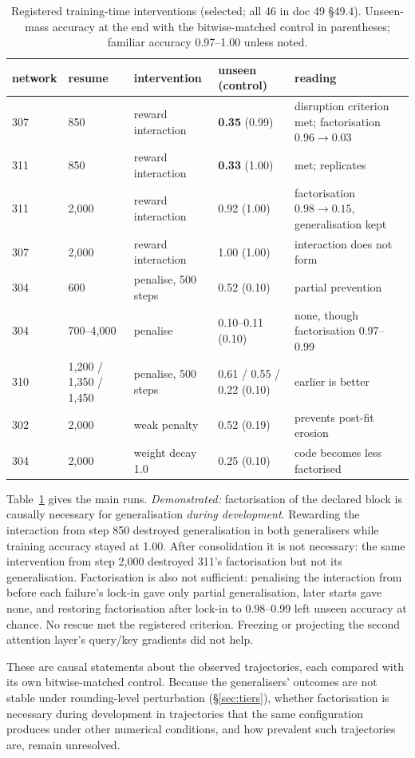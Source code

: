 \documentclass[11pt]{article}
\begin{document}
\begin{table}[t]\centering\small
\caption{Registered training-time interventions (selected; all 46 in doc 49 \S49.4). Unseen-mass accuracy at the end
with the bitwise-matched control in parentheses; familiar accuracy 0.97--1.00 unless noted.}\label{tab:causal}
\begin{tabular}{@{}llllp{3.8cm}@{}}\toprule
network & resume & intervention & unseen (control) & reading\\\midrule
307 & 850 & reward interaction & \textbf{0.35} (0.99) & disruption criterion met; factorisation $0.96\to0.03$\\
311 & 850 & reward interaction & \textbf{0.33} (1.00) & met; replicates\\
311 & 2,000 & reward interaction & 0.92 (1.00) & factorisation $0.98\to0.15$, generalisation kept\\
307 & 2,000 & reward interaction & 1.00 (1.00) & interaction does not form\\
304 & 600 & penalise, 500 steps & 0.52 (0.10) & partial prevention\\
304 & 700--4,000 & penalise & 0.10--0.11 (0.10) & none, though factorisation 0.97--0.99\\
310 & 1,200 / 1,350 / 1,450 & penalise, 500 steps & 0.61 / 0.55 / 0.22 (0.10) & earlier is better\\
302 & 2,000 & weak penalty & 0.52 (0.19) & prevents post-fit erosion\\
304 & 2,000 & weight decay 1.0 & 0.25 (0.10) & code becomes less factorised\\\bottomrule
\end{tabular}
\end{table}
Table~\ref{tab:causal} gives the main runs. \emph{Demonstrated:} factorisation of the declared block is causally
necessary for generalisation \emph{during development}. Rewarding the interaction from step 850 destroyed
generalisation in both generalisers while training accuracy stayed at 1.00. After consolidation it is not necessary:
the same intervention from step 2,000 destroyed 311's factorisation but not its generalisation. Factorisation is also
not sufficient: penalising the interaction from before each failure's lock-in gave only partial generalisation, later
starts gave none, and restoring factorisation after lock-in to 0.98--0.99 left unseen accuracy at chance. No rescue met
the registered criterion. Freezing or projecting the second attention layer's query/key gradients did not help.

These are causal statements about the observed trajectories, each compared with its own bitwise-matched control. Because
the generalisers' outcomes are not stable under rounding-level perturbation (\S\ref{sec:tiers}), whether factorisation
is necessary during development in trajectories that the same configuration produces under other numerical conditions,
and how prevalent such trajectories are, remain unresolved.
\end{document}

